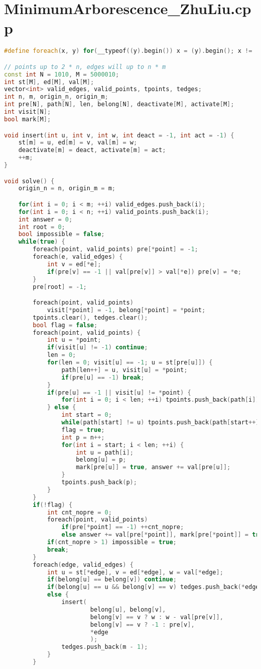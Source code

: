 \section{MinimumArborescence_ZhuLiu.cpp}
\begin{lstlisting}[language=c++]
#define foreach(x, y) for(__typeof((y).begin()) x = (y).begin(); x != (y).end(); ++x)

// points up to 2 * n, edges will up to n * m
const int N = 1010, M = 5000010;
int st[M], ed[M], val[M];
vector<int> valid_edges, valid_points, tpoints, tedges;
int n, m, origin_n, origin_m;
int pre[N], path[N], len, belong[N], deactivate[M], activate[M];
int visit[N];
bool mark[M];

void insert(int u, int v, int w, int deact = -1, int act = -1) {
	st[m] = u, ed[m] = v, val[m] = w;
	deactivate[m] = deact, activate[m] = act;
	++m;
}

void solve() {
	origin_n = n, origin_m = m;

	for(int i = 0; i < m; ++i) valid_edges.push_back(i);
	for(int i = 0; i < n; ++i) valid_points.push_back(i);
	int answer = 0;
	int root = 0;
    bool impossible = false;
	while(true) {
		foreach(point, valid_points) pre[*point] = -1;
		foreach(e, valid_edges) {
			int v = ed[*e];
			if(pre[v] == -1 || val[pre[v]] > val[*e]) pre[v] = *e;
		}
		pre[root] = -1;

		foreach(point, valid_points)
			visit[*point] = -1, belong[*point] = *point;
		tpoints.clear(), tedges.clear();
		bool flag = false;
		foreach(point, valid_points) {
			int u = *point;
			if(visit[u] != -1) continue;
			len = 0;
			for(len = 0; visit[u] == -1; u = st[pre[u]]) {
				path[len++] = u, visit[u] = *point;
				if(pre[u] == -1) break;
			}
			if(pre[u] == -1 || visit[u] != *point) {
				for(int i = 0; i < len; ++i) tpoints.push_back(path[i]);
			} else {
                int start = 0;
                while(path[start] != u) tpoints.push_back(path[start++]);
				flag = true;
				int p = n++;
				for(int i = start; i < len; ++i) {
					int u = path[i];
					belong[u] = p;
                    mark[pre[u]] = true, answer += val[pre[u]];
				}
				tpoints.push_back(p);
			}
		}
		if(!flag) {
            int cnt_nopre = 0;
			foreach(point, valid_points)
				if(pre[*point] == -1) ++cnt_nopre;
                else answer += val[pre[*point]], mark[pre[*point]] = true;
            if(cnt_nopre > 1) impossible = true;
			break;
		}
		foreach(edge, valid_edges) {
			int u = st[*edge], v = ed[*edge], w = val[*edge];
			if(belong[u] == belong[v]) continue;
			if(belong[u] == u && belong[v] == v) tedges.push_back(*edge);
			else {
				insert(
						belong[u], belong[v], 
						belong[v] == v ? w : w - val[pre[v]], 
						belong[v] == v ? -1 : pre[v],
						*edge
						);
				tedges.push_back(m - 1);
			}
		}


\end{lstlisting}
